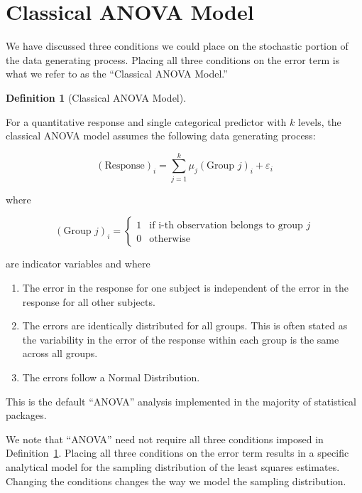 \documentclass[
  letterpaper,
  DIV=11,
  numbers=noendperiod]{scrreprt}
\providecommand{\tightlist}{%
  \setlength{\itemsep}{0pt}\setlength{\parskip}{0pt}}\usepackage{longtable,booktabs,array}
\theoremstyle{definition}
\newtheorem{definition}{Definition}[chapter]
\theoremstyle{definition}
\theoremstyle{plain}
\theoremstyle{remark}
\begin{document}
\hypertarget{classical-anova-model}{%
\section{Classical ANOVA Model}\label{classical-anova-model}}

We have discussed three conditions we could place on the stochastic
portion of the data generating process. Placing all three conditions on
the error term is what we refer to as the ``Classical ANOVA Model.''

\begin{definition}[Classical ANOVA
Model]\protect\hypertarget{def-classical-anova}{}\label{def-classical-anova}

For a quantitative response and single categorical predictor with \(k\)
levels, the classical ANOVA model assumes the following data generating
process:

\[(\text{Response})_i = \sum_{j=1}^{k} \mu_j (\text{Group } j)_i + \varepsilon_i\]

where

\[
(\text{Group } j)_{i} = \begin{cases}
  1 & \text{if i-th observation belongs to group } j \\
  0 & \text{otherwise}
  \end{cases}
\]

are indicator variables and where

\begin{enumerate}
\def\labelenumi{\arabic{enumi}.}
\tightlist
\item
  The error in the response for one subject is independent of the error
  in the response for all other subjects.
\item
  The errors are identically distributed for all groups. This is often
  stated as the variability in the error of the response within each
  group is the same across all groups.
\item
  The errors follow a Normal Distribution.
\end{enumerate}

This is the default ``ANOVA'' analysis implemented in the majority of
statistical packages.

\end{definition}

We note that ``ANOVA'' need not require all three conditions imposed in
Definition~\ref{def-classical-anova}. Placing all three conditions on
the error term results in a specific analytical model for the sampling
distribution of the least squares estimates. Changing the conditions
changes the way we model the sampling distribution.
\end{document}
